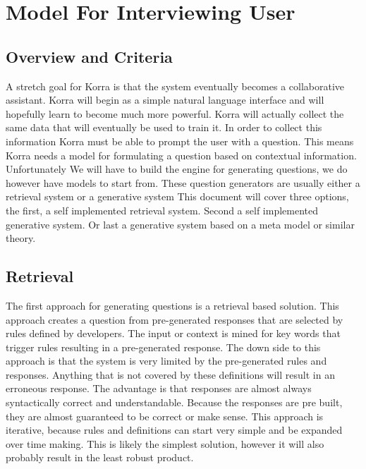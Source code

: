 \documentclass[onecolumn, draftclsnofoot,10pt, compsoc]{IEEEtran}
\begin{document}
\section{Model For Interviewing User}

 	\subsection{Overview and Criteria}
 	A stretch goal for Korra is that the system eventually becomes a collaborative assistant. 
    Korra will begin as a simple natural language interface and will hopefully learn to become much more powerful.
    Korra will actually collect the same data that will eventually be used to train it.
    In order to collect this information Korra must be able to prompt the user with a question.
    This means Korra needs a model for formulating a question based on contextual information.
    Unfortunately We will have to build the engine for generating questions, we do however have models to start from.
    These question generators are usually either a retrieval system or a generative system
    This document will cover three options, the first, a self implemented retrieval system. 
    Second a self implemented generative system. 
    Or last a generative system based on a meta model or similar theory.
    
    \subsection{Retrieval}
    The first approach for generating questions is a retrieval based solution. 
    This approach creates a question from pre-generated responses that are selected by rules defined by developers.
    The input or context is mined for key words that trigger rules resulting in a pre-generated response.
    The down side to this approach is that the system is very limited by the pre-generated rules and responses.
    Anything that is not covered by these definitions will result in an erroneous response.
    The advantage is that responses are almost always syntactically correct and understandable.
    Because the responses are pre built, they are almost guaranteed to be correct or make sense.
    This approach is iterative, because rules and definitions can start very simple and be expanded over time making.
    This is likely the simplest solution, however it will also probably result in the least robust product.
   
\end{document}
